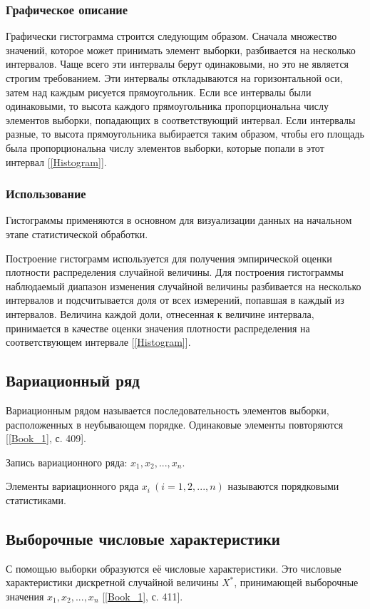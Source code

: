 \documentclass[12pt,a4paper]{article}
\begin{document}
		\subsubsection{Графическое описание}
			Графически гистограмма строится следующим образом. Сначала множество значений, которое может принимать элемент выборки, разбивается на
			несколько интервалов. Чаще всего эти интервалы берут одинаковыми, но
			это не является строгим требованием. Эти интервалы откладываются на
			горизонтальной оси, затем над каждым рисуется прямоугольник. Если все
			интервалы были одинаковыми, то высота каждого прямоугольника пропорциональна числу элементов выборки, попадающих в соответствующий
			интервал. Если интервалы разные, то высота прямоугольника выбирается
			таким образом, чтобы его площадь была пропорциональна числу элементов
			выборки, которые попали в этот интервал [\ref{Histogram}].

		\subsubsection{Использование}
			Гистограммы применяются в основном для визуализации данных на начальном этапе статистической обработки.
			
			Построение гистограмм используется для получения эмпирической оценки плотности распределения случайной величины. Для построения гистограммы наблюдаемый диапазон изменения случайной величины разбивается на несколько интервалов и подсчитывается доля от всех измерений, попавшая в каждый из интервалов. Величина каждой доли, отнесенная к величине интервала, принимается в качестве оценки значения плотности распределения на соответствующем интервале [\ref{Histogram}].
		
	\subsection{Вариационный ряд}
		Вариационным рядом называется последовательность элементов выборки, расположенных в неубывающем порядке. Одинаковые элементы повторяются  [\ref{Book_1}, с. 409].
		
		Запись вариационного ряда: $x_1, x_2, ... , x_n$.
		
		Элементы вариационного ряда $x_i\ (i = 1,2, ... ,n)$ называются порядковыми статистиками.
	
	\subsection{Выборочные числовые характеристики}
		С помощью выборки образуются её числовые характеристики. Это числовые характеристики дискретной случайной величины $X^*$, принимающей выборочные значения $x_1, x_2, ... , x_n$ [\ref{Book_1}, с. 411].
			
\end{document}
